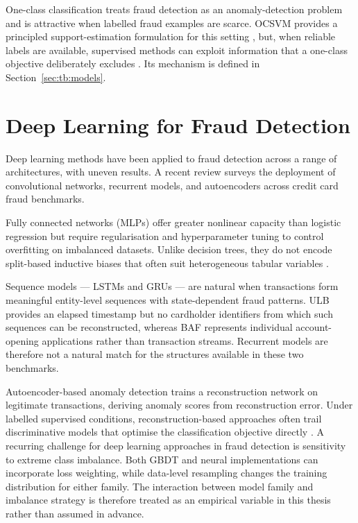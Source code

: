 One-class classification treats fraud detection as an anomaly-detection problem and is attractive when labelled fraud examples are scarce. OCSVM provides a principled support-estimation formulation for this setting \cite{scholkopf2001estimating}, but, when reliable labels are available, supervised methods can exploit information that a one-class objective deliberately excludes \cite{leevy2023binary, thimonier2024comparative}. Its mechanism is defined in Section~\ref{sec:tb:models}.

\section{Deep Learning for Fraud Detection}
\label{subsec:deep_learning}

Deep learning methods have been applied to fraud detection across a range of architectures, with uneven results. A recent review \cite{mienye2024deep} surveys the deployment of convolutional networks, recurrent models, and autoencoders across credit card fraud benchmarks.

Fully connected networks (MLPs) offer greater nonlinear capacity than logistic regression but require regularisation and hyperparameter tuning to control overfitting on imbalanced datasets. Unlike decision trees, they do not encode split-based inductive biases that often suit heterogeneous tabular variables \cite{borisov2022deep}.

Sequence models — LSTMs and GRUs — are natural when transactions form meaningful entity-level sequences with state-dependent fraud patterns. ULB provides an elapsed timestamp but no cardholder identifiers from which such sequences can be reconstructed, whereas BAF represents individual account-opening applications rather than transaction streams. Recurrent models are therefore not a natural match for the structures available in these two benchmarks.

Autoencoder-based anomaly detection trains a reconstruction network on legitimate transactions, deriving anomaly scores from reconstruction error. Under labelled supervised conditions, reconstruction-based approaches often trail discriminative models that optimise the classification objective directly \cite{hilal2022financial}. A recurring challenge for deep learning approaches in fraud detection is sensitivity to extreme class imbalance. Both GBDT and neural implementations can incorporate loss weighting, while data-level resampling changes the training distribution for either family. The interaction between model family and imbalance strategy is therefore treated as an empirical variable in this thesis rather than assumed in advance.

